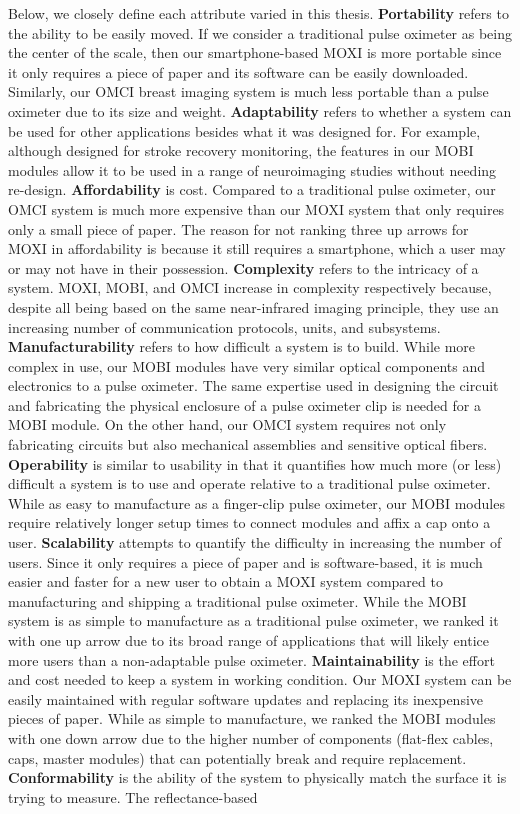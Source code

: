 Below, we closely define each attribute varied in this thesis.  \textbf{Portability} refers to the ability to be easily moved. If we consider a traditional pulse oximeter as being the center of the scale, then our smartphone-based \ac{MOXI} is more portable since it only requires a piece of paper and its software can be easily downloaded. Similarly, our \ac{OMCI} breast imaging system is much less portable than a pulse oximeter due to its size and weight. \textbf{Adaptability} refers to whether a system can be used for other applications besides what it was designed for. For example, although designed for stroke recovery monitoring, the features in our \ac{MOBI} modules allow it to be used in a range of neuroimaging studies without needing re-design. \textbf{Affordability} is cost. Compared to a traditional pulse oximeter, our \ac{OMCI} system is much more expensive than our \ac{MOXI} system that only requires only a small piece of paper. The reason for not ranking three up arrows for \ac{MOXI} in affordability is because it still requires a smartphone, which a user may or may not have in their possession. \textbf{Complexity} refers to the intricacy of a system. \ac{MOXI}, \ac{MOBI}, and \ac{OMCI} increase in complexity respectively because, despite all being based on the same near-infrared imaging principle, they use an increasing number of communication protocols, units, and subsystems. \textbf{Manufacturability} refers to how difficult a system is to build. While more complex in use, our \ac{MOBI} modules have very similar optical components and electronics to a pulse oximeter. The same expertise used in designing the circuit and fabricating the physical enclosure of a pulse oximeter clip is needed for a \ac{MOBI} module. On the other hand, our \ac{OMCI} system requires not only fabricating circuits but also mechanical assemblies and sensitive optical fibers. \textbf{Operability} is similar to usability in that it quantifies how much more (or less) difficult a system is to use and operate relative to a traditional pulse oximeter. While as easy to manufacture as a finger-clip pulse oximeter, our \ac{MOBI} modules require relatively longer setup times to connect modules and affix a cap onto a user. \textbf{Scalability} attempts to quantify the difficulty in increasing the number of users. Since it only requires a piece of paper and is software-based, it is much easier and faster for a new user to obtain a \ac{MOXI} system compared to manufacturing and shipping a traditional pulse oximeter.  While the \ac{MOBI} system is as simple to manufacture as a traditional pulse oximeter, we ranked it with one up arrow due to its broad range of applications that will likely entice more users than a non-adaptable pulse oximeter. \textbf{Maintainability} is the effort and cost needed to keep a system in working condition. Our \ac{MOXI} system can be easily maintained with regular software updates and replacing its inexpensive pieces of paper. While as simple to manufacture, we ranked the \ac{MOBI} modules with one down arrow due to the higher number of components (flat-flex cables, caps, master modules) that can potentially break and require replacement. \textbf{Conformability} is the ability of the system to physically match the surface it is trying to measure. The reflectance-based 